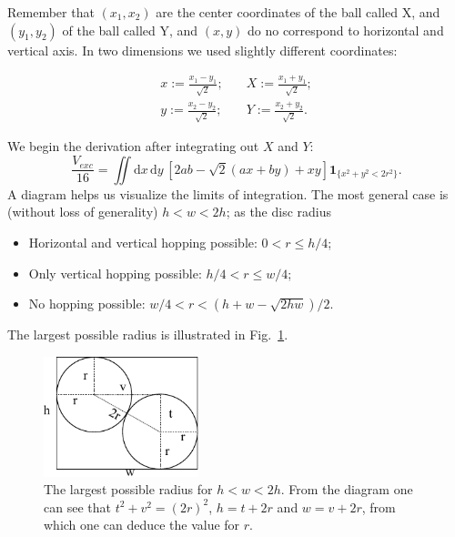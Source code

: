\documentclass[superscriptaddress,pre,reprint,showpacs,twocolumn]{revtex4-1}
\newcommand{\defeq}{:=}
\newcommand{\rd}[1]{\mathrm{d}{#1} \,}
\newcommand{\indicatorsymbol}{\mathbf{1}}
\newcommand{\indicator}[1]{\indicatorsymbol_{ \{   #1 \} } }
\begin{document}
Remember that $(x_1, x_2)$ are the center coordinates of the
ball called X, and $(y_1, y_2)$ of the ball called Y,
and $(x,y)$  do no correspond to horizontal and vertical axis.
In two dimensions we used slightly different coordinates:

\begin{equation}\label{cambiocoor2d}
  \begin{split}
 x  \defeq \frac{x_1 - y_1}{\sqrt{2}};  &
\quad X  \defeq \frac{x_1 + y_1}{\sqrt{2}};  \\
 y  \defeq \frac{x_2 - y_2}{\sqrt{2}}; & 
\quad Y  \defeq \frac{x_2 + y_2}{\sqrt{2}}.
  \end{split}
\end{equation}

We begin the derivation after integrating out $X$ and $Y$:
\begin{equation}\label{volgral2d}
\frac{V_{exc}}{16}  =\iint \rd x \rd y \left[ 2ab-\sqrt{2}(ax+by)+x y \right]
\indicator{x^2+y^2 < 2r^2 }.
\end{equation}
A diagram helps us visualize the limits of integration. The most general
case is (without loss of generality) $h < w < 2h$; as the disc radius 
\begin{itemize}
\item Horizontal and vertical hopping possible: $0 <r \leq h/4$;
\item Only vertical hopping possible: $h/4 < r \leq w/4$;
\item No hopping possible: $w/4 < r < (h+w - \sqrt{2hw}) / 2$.
\end{itemize}
The largest possible radius is illustrated in Fig.~\ref{radiomaximo}.

\begin{figure}[h]
  \centering
  \includegraphics[width=0.4\textwidth]{figures/DiagramaRadioMaximo.pdf}
  \caption{The largest possible radius for $h<w<2h$. From the diagram
    one can see that $t^2+v^2=(2r)^2$, $h=t+2r$ and $w=v+2r$, from which
    one can deduce the value for $r$.}
  \label{radiomaximo}
\end{figure}
\end{document}

